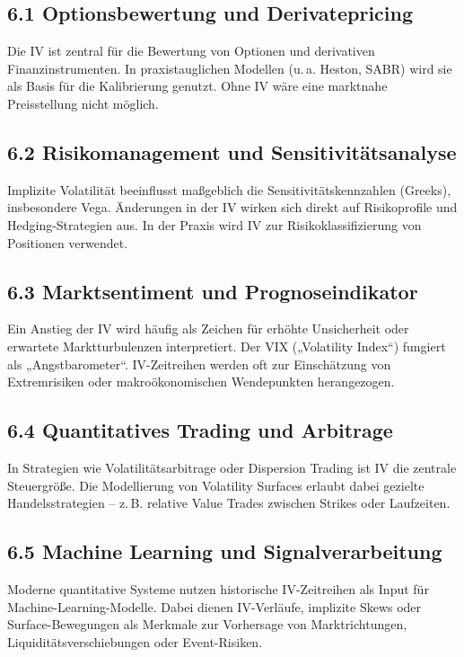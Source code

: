 \documentclass[a4paper,12pt]{article}
\begin{document}
\subsection*{6.1 Optionsbewertung und Derivatepricing}
Die IV ist zentral für die Bewertung von Optionen und derivativen Finanzinstrumenten. In praxistauglichen Modellen (u.\,a. Heston, SABR) wird sie als Basis für die Kalibrierung genutzt. Ohne IV wäre eine marktnahe Preisstellung nicht möglich.

\subsection*{6.2 Risikomanagement und Sensitivitätsanalyse}
Implizite Volatilität beeinflusst maßgeblich die Sensitivitätskennzahlen (Greeks), insbesondere Vega. Änderungen in der IV wirken sich direkt auf Risikoprofile und Hedging-Strategien aus. In der Praxis wird IV zur Risikoklassifizierung von Positionen verwendet.

\subsection*{6.3 Marktsentiment und Prognoseindikator}
Ein Anstieg der IV wird häufig als Zeichen für erhöhte Unsicherheit oder erwartete Marktturbulenzen interpretiert. Der VIX („Volatility Index“) fungiert als „Angstbarometer“. IV-Zeitreihen werden oft zur Einschätzung von Extremrisiken oder makroökonomischen Wendepunkten herangezogen.

\subsection*{6.4 Quantitatives Trading und Arbitrage}
In Strategien wie Volatilitätsarbitrage oder Dispersion Trading ist IV die zentrale Steuergröße. Die Modellierung von Volatility Surfaces erlaubt dabei gezielte Handelsstrategien – z.\,B. relative Value Trades zwischen Strikes oder Laufzeiten.

\subsection*{6.5 Machine Learning und Signalverarbeitung}
Moderne quantitative Systeme nutzen historische IV-Zeitreihen als Input für Machine-Learning-Modelle. Dabei dienen IV-Verläufe, implizite Skews oder Surface-Bewegungen als Merkmale zur Vorhersage von Marktrichtungen, Liquiditätsverschiebungen oder Event-Risiken.

\clearpage
\end{document}
